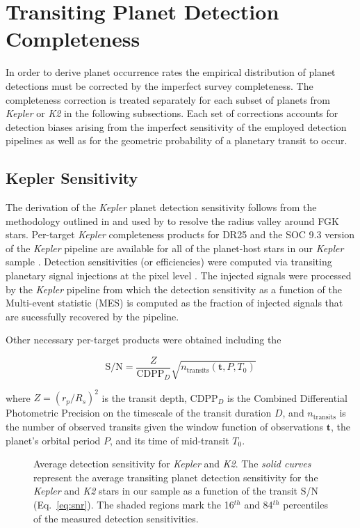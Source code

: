 \documentclass[modern]{aastex63}
\newcommand\kepler{\emph{Kepler}}
\newcommand\ktwo{\emph{K2}}
\begin{document}
\section{Transiting Planet Detection Completeness}  \label{sect:completeness}
In order to derive planet occurrence rates the empirical distribution of planet detections must be corrected
by the imperfect survey completeness. The completeness correction is treated separately for each subset
of planets from \kepler{} or \ktwo{} in the following subsections. Each set of corrections accounts for detection
biases arising from the imperfect sensitivity of the employed detection pipelines as well as for the
geometric probability of a planetary transit to occur.

\subsection{Kepler Sensitivity}
The derivation of the \kepler{} planet detection sensitivity follows from the methodology outlined in
\cite{christiansen16} and used by \cite{fulton17} to resolve the radius valley around FGK stars. Per-target
\kepler{} completeness products for DR25 and the SOC 9.3 version of the \kepler{} pipeline
\citep{jenkins10} are available
for all of the planet-host stars in our \kepler{} sample \citep{burke15,burke17}. Detection sensitivities
(or efficiencies) were computed via transiting planetary signal injections at the pixel level
\citep{christiansen15,christiansen17}. The injected signals were processed by the \kepler{} pipeline from
which the detection sensitivity as a function of the Multi-event statistic (MES) is computed as the fraction of
injected signals that are sucessfully recovered by the pipeline.


Other necessary per-target
products were obtained including the

\begin{equation}
  \text{S/N} = \frac{Z}{\text{CDPP}_{D}} \sqrt{n_{\text{transits}}(\textbf{t},P,T_0)}  \label{eq:snr}
\end{equation}

\noindent where $Z=(r_p/R_s)^2$ is the transit depth, CDPP$_D$ is the Combined Differential Photometric
Precision on the timescale of the transit duration $D$, and $n_{\text{transits}}$ is the number of
observed transits given the window function of observations $\textbf{t}$, the planet's orbital period $P$,
and its time of mid-transit $T_0$.


\begin{figure}
  \centering
  \caption{Average detection sensitivity for \kepler{} and \ktwo{.} The \emph{solid curves} represent the
    average transiting planet detection sensitivity for the \kepler{} and \ktwo{} stars in our sample as
    a function of the transit S/N (Eq.~\ref{eq:snr}). The shaded regions mark the 16$^{th}$ and 84$^{th}$
    percentiles of the measured detection sensitivities.} 
  \label{fig:senscurves}
\end{figure}
\end{document}
